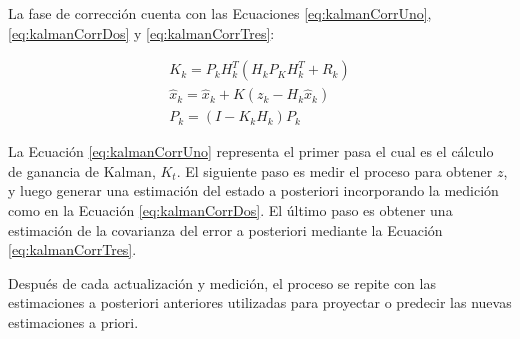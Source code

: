 La fase de corrección cuenta con las Ecuaciones \ref{eq:kalmanCorrUno}, \ref{eq:kalmanCorrDos} y \ref{eq:kalmanCorrTres}:

\begin{eqnarray}
    \label{eq:kalmanCorrUno}
    K_k = P_kH^{T}_k(H_kP_KH^{T}_k + R_k)\\
    \label{eq:kalmanCorrDos}
    \hat{x}_k = \hat{x}_k + K(z_k - H_k \hat{x}_k)\\
    \label{eq:kalmanCorrTres}
    P_k = (I - K_kH_k)P_k
\end{eqnarray}

La Ecuación \ref{eq:kalmanCorrUno} representa el primer pasa el cual es el cálculo de ganancia de Kalman, $K_t$. El siguiente paso es medir el proceso para obtener $z$, y luego generar una estimación del estado a posteriori incorporando la medición como en la Ecuación \ref{eq:kalmanCorrDos}. El último paso es obtener una estimación de la covarianza del error a posteriori mediante la Ecuación \ref{eq:kalmanCorrTres}.

Después de cada actualización y medición, el proceso se repite con las estimaciones a posteriori anteriores utilizadas para proyectar o predecir las nuevas estimaciones a priori.

